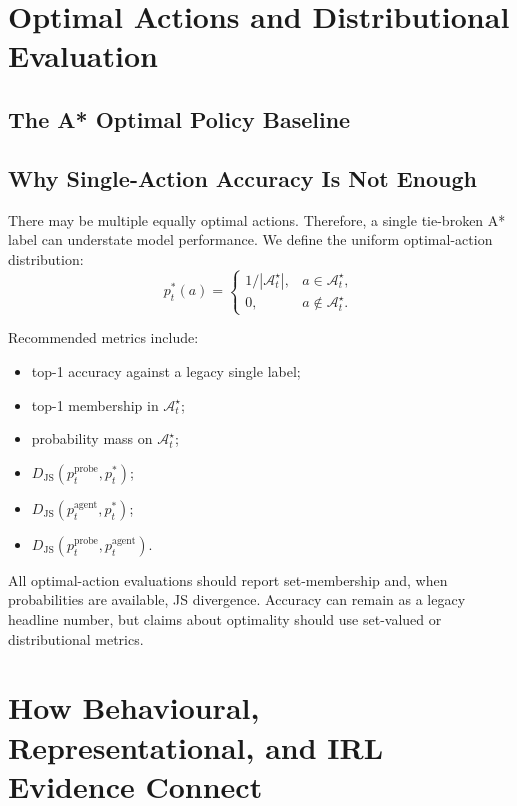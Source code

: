 \documentclass[11pt,a4paper]{article}
\newcommand{\optset}{\mathcal{A}^{\star}}
\newcommand{\JS}{D_{\mathrm{JS}}}
\begin{document}
\section{Optimal Actions and Distributional Evaluation}

\subsection{The A* Optimal Policy Baseline}





\subsection{Why Single-Action Accuracy Is Not Enough}

There may be multiple equally optimal actions. Therefore, a single tie-broken A* label can understate model performance. We define the uniform optimal-action distribution:
\[
p_t^*(a)=
\begin{cases}
1/|\optset_t|, & a\in\optset_t,\\
0, & a\notin\optset_t.
\end{cases}
\]

Recommended metrics include:
\begin{itemize}[leftmargin=*]
\item top-1 accuracy against a legacy single label;
\item top-1 membership in $\optset_t$;
\item probability mass on $\optset_t$;
\item $\JS(p_t^{\mathrm{probe}},p_t^*)$;
\item $\JS(p_t^{\mathrm{agent}},p_t^*)$;
\item $\JS(p_t^{\mathrm{probe}},p_t^{\mathrm{agent}})$.
\end{itemize}

\begin{todo}
All optimal-action evaluations should report set-membership and, when probabilities are available, JS divergence. Accuracy can remain as a legacy headline number, but claims about optimality should use set-valued or distributional metrics.
\end{todo}

\section{How Behavioural, Representational, and IRL Evidence Connect}
\end{document}
